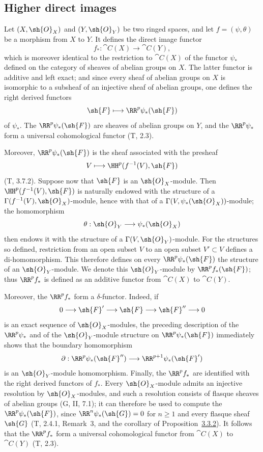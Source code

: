 \subsection{Higher direct images}
\label{subsection:0.12.2}

\begin{env}[12.2.1]
\label{0.12.2.1}
Let $(X,\sh{O}_X)$ and $(Y,\sh{O}_Y)$ be two ringed spaces, and let
$f=(\psi,\theta)$ be a morphism from $X$ to $Y$.  It defines the direct
image functor
\[
  f_*:\cat{C}(X)\longrightarrow\cat{C}(Y),
\]
which is moreover identical to the restriction to $\cat{C}(X)$ of the
functor $\psi_*$ defined on the category of sheaves of abelian groups
on $X$.
The latter functor is additive and left exact; and since every sheaf of
abelian groups on $X$ is isomorphic to a subsheaf of an injective sheaf
of abelian groups, one defines the right derived functors
\[
  \sh{F}\longmapsto\RR^p\psi_*(\sh{F})
\]
of $\psi_*$.  The $\RR^p\psi_*(\sh{F})$ are sheaves of abelian groups
on $Y$, and the $\RR^p\psi_*$ form a universal cohomological functor
(T, 2.3).

Moreover, $\RR^p\psi_*(\sh{F})$ is the sheaf associated with the
presheaf
\[
  V\longmapsto\HH^p(f^{-1}(V),\sh{F})
\]
(T, 3.7.2).
Suppose now that $\sh{F}$ is an $\sh{O}_X$-module.
Then $\HH^p(f^{-1}(V),\sh{F})$ is naturally endowed with the structure
of a $\Gamma(f^{-1}(V),\sh{O}_X)$-module, hence with that of a
$\Gamma(V,\psi_*(\sh{O}_X))$-module; the homomorphism
\[
  \theta:\sh{O}_Y\longrightarrow\psi_*(\sh{O}_X)
\]
then endows it with the structure of a
$\Gamma(V,\sh{O}_Y)$-module.
For the structures so defined, restriction from an open subset $V$ to
an open subset $V'\subset V$ defines a di-homomorphism.  This therefore
defines on every $\RR^p\psi_*(\sh{F})$ the structure of an
$\sh{O}_Y$-module.  We denote this $\sh{O}_Y$-module by
$\RR^p f_*(\sh{F})$; thus $\RR^p f_*$ is defined as an additive
functor from $\cat{C}(X)$ to $\cat{C}(Y)$.

Moreover, the $\RR^p f_*$ form a $\delta$-functor.  Indeed, if
\[
  0\longrightarrow\sh{F}'\longrightarrow\sh{F}
  \longrightarrow\sh{F}''\longrightarrow0
\]
is an exact sequence of $\sh{O}_X$-modules, the preceding description
of the $\RR^p\psi_*$ and of the $\sh{O}_Y$-module structure on
$\RR^p\psi_*(\sh{F})$ immediately shows that the boundary homomorphism
\[
  \partial:\RR^p\psi_*(\sh{F}'')
  \longrightarrow\RR^{p+1}\psi_*(\sh{F}')
\]
is an $\sh{O}_Y$-module homomorphism.
Finally, the $\RR^p f_*$ are identified with the right derived functors
of $f_*$.  Every $\sh{O}_X$-module admits an injective resolution by
$\sh{O}_X$-modules, and such a resolution consists of flasque sheaves
of abelian groups (G, II, 7.1); it can therefore be used to compute the
$\RR^p\psi_*(\sh{F})$, since $\RR^n\psi_*(\sh{G})=0$ for $n\geq1$
and every flasque sheaf $\sh{G}$ (T, 2.4.1, Remark~3, and the
corollary of Proposition~\hyperref[0.3.3.2]{3.3.2}).
It follows that the $\RR^p f_*$ form a universal cohomological functor
from $\cat{C}(X)$ to $\cat{C}(Y)$ (T, 2.3).
\end{env}

